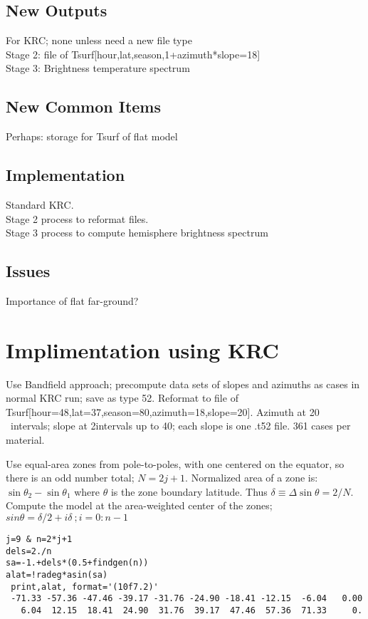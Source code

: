 \documentclass{article}
\begin{document}
\subsection{New Outputs} %
For KRC; none unless need a new file type
\\ Stage 2: file of Tsurf[hour,lat,season,1+azimuth*slope=18] 
\\ Stage 3: Brightness temperature spectrum 
\subsection{New Common Items} %
Perhaps: storage for Tsurf of flat model
\subsection{Implementation} %
Standard KRC. 
\\ Stage 2 process to reformat files. 
\\ Stage 3 process to compute hemisphere brightness spectrum

\subsection{Issues}  %
Importance of  flat far-ground?

\section{Implimentation using KRC}
Use Bandfield approach; precompute data sets of slopes and azimuths as cases in
normal KRC run; save as type 52. Reformat to file of
Tsurf[hour=48,lat=37,season=80,azimuth=18,slope=20]. Azimuth at 20\qd
~intervals; slope at 2\qd intervals up to 40\qd; each slope is one .t52
file. 361 cases per material.

Use equal-area zones from pole-to-poles, with one centered on the equator, so
there is an odd number total; $N=2j+1$.  Normalized area of a zone is: $\sin
\theta_2 - \sin \theta_1$ where $\theta$ is the zone boundary latitude. Thus
$\delta \equiv \Delta \sin \theta = 2/N $.  Compute the model at the
area-weighted center of the zones; $sin \theta= \delta/2+i \delta \ ; i=0:n-1$
\begin{verbatim}
j=9 & n=2*j+1
dels=2./n
sa=-1.+dels*(0.5+findgen(n))
alat=!radeg*asin(sa)
 print,alat, format='(10f7.2)'
 -71.33 -57.36 -47.46 -39.17 -31.76 -24.90 -18.41 -12.15  -6.04   0.00
   6.04  12.15  18.41  24.90  31.76  39.17  47.46  57.36  71.33     0.
\end{verbatim}  
\end{document}

